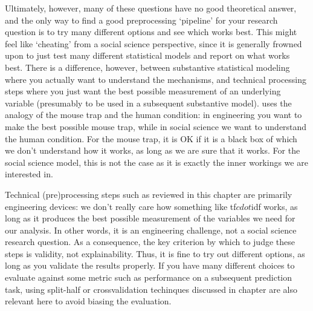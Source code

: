 Ultimately, however, many of these questions have no good theoretical answer, and the only way to find a good preprocessing `pipeline' for your research question is to try many different
options and see which works best.
This might feel like `cheating' from a social science perspective, since it is generally frowned upon to just test many different statistical models and report on what works best.
There is a difference, however, between substantive statistical modeling where you actually want to understand the mechanisms,
and technical processing steps where you just want the best possible measurement of an underlying variable (presumably to be used in a subsequent substantive model).
\citet{mousetrap} uses the analogy of the mouse trap and the human condition: in engineering you want to make the best possible mouse trap, 
while in social science we want to understand the human condition.
For the mouse trap, it is OK if it is a black box of which we don't understand how it works, as long as we are sure that it works.
For the social science model, this is not the case as it is exactly the inner workings we are interested in.

Technical (pre)processing steps such as reviewed in this chapter are primarily engineering devices:
we don't really care how something like tf$cdot$idf works, as long as it produces the best possible measurement of the variables we need for our analysis.
In other words, it is an engineering challenge, not a social science research question.
As a consequence, the key criterion by which to judge these steps is validity, not explainability.
Thus, it is fine to try out different options, as long as you validate the results properly.
If you have many different choices to evaluate against some metric such as performance on a subsequent prediction task,
using split-half or crossvalidation techinques discussed in chapter  are also relevant here to avoid biasing the evaluation.
